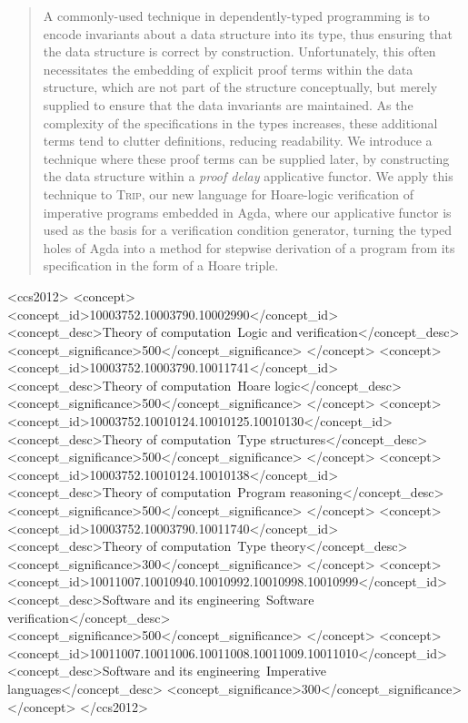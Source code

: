\documentclass[sigplan,review]{acmart}\settopmatter{printfolios=true,printccs=false,printacmref=false}
\begin{document}
\def\figureautorefname{Figure}
\def\sectionautorefname{Section}
\def\subsectionautorefname{Section}
\newcommand{\TODO}[1]{\textbf{TODO} \hl{#1}}
  \newcommand{\trip}[3]{ \{ #1 \}\ #2\ \{ #3\} }
  \newcommand{\pee}{\mathcal{P}}
  \newcommand{\quu}{\mathcal{Q}}
\begin{abstract}
A commonly-used technique in dependently-typed programming is to encode 
invariants about a data structure into its type, thus ensuring that 
the data structure is correct by construction.
Unfortunately, this often necessitates the embedding of explicit
proof terms within the data structure, which are not part of the structure 
conceptually, but merely supplied to ensure that the data invariants are maintained.
As the complexity of the specifications in the types increases,
these additional terms tend to clutter definitions, reducing readability.
We introduce a technique where these proof terms can be supplied later, by
constructing the data structure within a \emph{proof delay} applicative functor. 
We apply this technique to \textsc{Trip}, our new language for Hoare-logic verification
of imperative programs embedded in Agda,
where our applicative functor is used as the basis for a verification condition 
generator, turning the typed holes of Agda into a method for stepwise derivation 
of a  program from its specification in the form of a Hoare triple. 
\end{abstract}
\begin{CCSXML}
<ccs2012>
<concept>
<concept_id>10003752.10003790.10002990</concept_id>
<concept_desc>Theory of computation~Logic and verification</concept_desc>
<concept_significance>500</concept_significance>
</concept>
<concept>
<concept_id>10003752.10003790.10011741</concept_id>
<concept_desc>Theory of computation~Hoare logic</concept_desc>
<concept_significance>500</concept_significance>
</concept>
<concept>
<concept_id>10003752.10010124.10010125.10010130</concept_id>
<concept_desc>Theory of computation~Type structures</concept_desc>
<concept_significance>500</concept_significance>
</concept>
<concept>
<concept_id>10003752.10010124.10010138</concept_id>
<concept_desc>Theory of computation~Program reasoning</concept_desc>
<concept_significance>500</concept_significance>
</concept>
<concept>
<concept_id>10003752.10003790.10011740</concept_id>
<concept_desc>Theory of computation~Type theory</concept_desc>
<concept_significance>300</concept_significance>
</concept>
<concept>
<concept_id>10011007.10010940.10010992.10010998.10010999</concept_id>
<concept_desc>Software and its engineering~Software verification</concept_desc>
<concept_significance>500</concept_significance>
</concept>
<concept>
<concept_id>10011007.10011006.10011008.10011009.10011010</concept_id>
<concept_desc>Software and its engineering~Imperative languages</concept_desc>
<concept_significance>300</concept_significance>
</concept>
</ccs2012>
\end{CCSXML}
\end{document}
